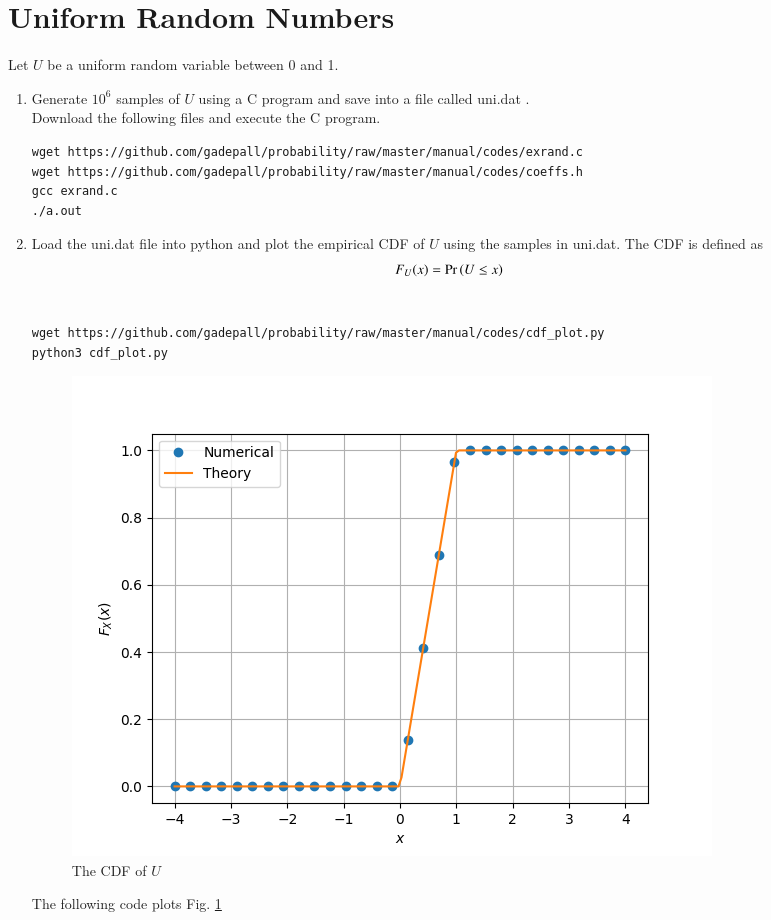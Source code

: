 \documentclass[journal,12pt,twocolumn]{IEEEtran}
\renewcommand\thesection{\arabic{section}}
\begin{document}
\section{Uniform Random Numbers}
Let $U$ be a uniform random variable between 0 and 1.
\begin{enumerate}[label=\thesection.\arabic*
,ref=\thesection.\theenumi]
\item Generate $10^6$ samples of $U$ using a C program and save into a file called uni.dat .
\\
\solution Download the following files and execute the  C program.
\begin{lstlisting}
wget https://github.com/gadepall/probability/raw/master/manual/codes/exrand.c
wget https://github.com/gadepall/probability/raw/master/manual/codes/coeffs.h
gcc exrand.c
./a.out
\end{lstlisting}

%
\item
Load the uni.dat file into python and plot the empirical CDF of $U$ using the samples in uni.dat. The CDF is defined as
\begin{align}
F_{U}(x) = \Pr\left(U \le x\right)
\end{align}
\\
\solution \begin{lstlisting}
wget https://github.com/gadepall/probability/raw/master/manual/codes/cdf_plot.py
python3 cdf_plot.py
\end{lstlisting}
\begin{figure}
\centering
\includegraphics[width=\columnwidth]{./figures/CDF_uni.png}
\caption{The CDF of $U$}
\label{fig:uni_cdf}
\end{figure}
 The following code plots Fig. \ref{fig:uni_cdf}


\end{enumerate}
\end{document}
